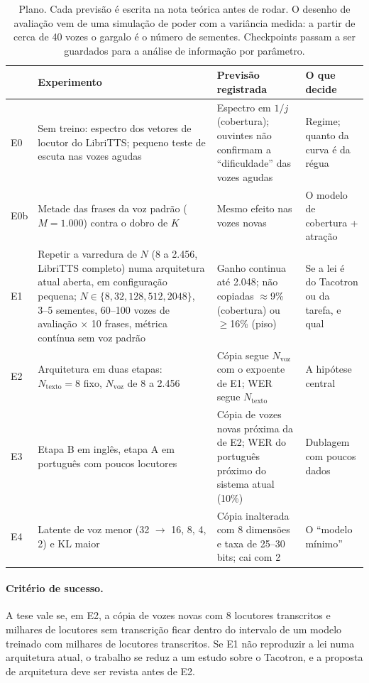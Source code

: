 \documentclass[a4paper,11pt]{article}
\begin{document}
\begin{table}[H]
\centering\small
\begin{tabular}{@{}p{0.6cm}p{4.6cm}p{5.4cm}p{4.2cm}@{}}
\toprule
& Experimento & Previsão registrada & O que decide\\
\midrule
E0 & Sem treino: espectro dos vetores de locutor do LibriTTS; pequeno teste de escuta nas vozes agudas & Espectro em $1/j$ (cobertura); ouvintes não confirmam a ``dificuldade'' das vozes agudas & Regime; quanto da curva é da régua\\
E0b & Metade das frases da voz padrão ($M=1.000$) contra o dobro de $K$ & Mesmo efeito nas vozes novas & O modelo de cobertura + atração\\
E1 & Repetir a varredura de $N$ (8 a 2.456, LibriTTS completo) numa arquitetura atual aberta, em configuração pequena; $N\in\{8,32,128,512,2048\}$, 3--5 sementes, 60--100 vozes de avaliação $\times$ 10 frases, métrica contínua sem voz padrão & Ganho continua até 2.048; não copiadas $\approx$9\% (cobertura) ou $\ge$16\% (piso) & Se a lei é do Tacotron ou da tarefa, e qual\\
E2 & Arquitetura em duas etapas: $N_{\text{texto}}=8$ fixo, $N_{\text{voz}}$ de 8 a 2.456 & Cópia segue $N_{\text{voz}}$ com o expoente de E1; WER segue $N_{\text{texto}}$ & A hipótese central\\
E3 & Etapa B em inglês, etapa A em português com poucos locutores & Cópia de vozes novas próxima da de E2; WER do português próximo do sistema atual (10\%) & Dublagem com poucos dados\\
E4 & Latente de voz menor (32 $\rightarrow$ 16, 8, 4, 2) e KL maior & Cópia inalterada com 8 dimensões e taxa de 25--30 bits; cai com 2 & O ``modelo mínimo''\\
\bottomrule
\end{tabular}
\caption{Plano. Cada previsão é escrita na nota teórica antes de rodar. O desenho de avaliação vem de uma simulação de poder com a variância medida: a partir de cerca de 40 vozes o gargalo é o número de sementes. Checkpoints passam a ser guardados para a análise de informação por parâmetro.}
\end{table}

\paragraph{Critério de sucesso.} A tese vale se, em E2, a cópia de vozes novas com 8 locutores transcritos e milhares de locutores sem transcrição ficar dentro do intervalo de um modelo treinado com milhares de locutores transcritos. Se E1 não reproduzir a lei numa arquitetura atual, o trabalho se reduz a um estudo sobre o Tacotron, e a proposta de arquitetura deve ser revista antes de E2.
\end{document}
